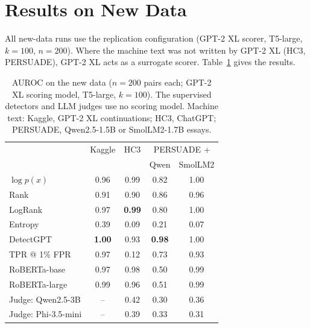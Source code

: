 \documentclass[11pt]{article}
\begin{document}
\section{Results on New Data}
\label{sec:results}
All new-data runs use the replication configuration (GPT-2 XL scorer, T5-large, $k=100$, $n=200$). Where the machine text was not written by GPT-2 XL (HC3, PERSUADE), GPT-2 XL acts as a surrogate scorer. Table~\ref{tab:newresults} gives the results.

\begin{table}[t]
\centering\small
\setlength{\tabcolsep}{3.2pt}
\begin{tabular}{lcccc}
\toprule
 & Kaggle & HC3 & \multicolumn{2}{c}{PERSUADE +} \\
 &  &  & Qwen & SmolLM2 \\
\midrule
$\log p(x)$  & 0.96 & 0.99 & 0.82 & 1.00 \\
Rank         & 0.91 & 0.90 & 0.86 & 0.96 \\
LogRank      & 0.97 & \textbf{0.99} & 0.80 & 1.00 \\
Entropy      & 0.39 & 0.09 & 0.21 & 0.07 \\
DetectGPT    & \textbf{1.00} & 0.93 & \textbf{0.98} & 1.00 \\
\quad TPR @ 1\% FPR & 0.97 & 0.12 & 0.73 & 0.93 \\
\midrule
RoBERTa-base  & 0.97 & 0.98 & 0.50 & 0.99 \\
RoBERTa-large & 0.99 & 0.96 & 0.51 & 0.99 \\
\midrule
Judge: Qwen2.5-3B   & -- & 0.42 & 0.30 & 0.36 \\
Judge: Phi-3.5-mini & -- & 0.39 & 0.33 & 0.31 \\
\bottomrule
\end{tabular}
\caption{AUROC on the new data ($n=200$ pairs each; GPT-2 XL scoring model, T5-large, $k=100$). The supervised detectors and LLM judges use no scoring model. Machine text: Kaggle, GPT-2 XL continuations; HC3, ChatGPT; PERSUADE, Qwen2.5-1.5B or SmolLM2-1.7B essays.}
\label{tab:newresults}
\end{table}
\end{document}
